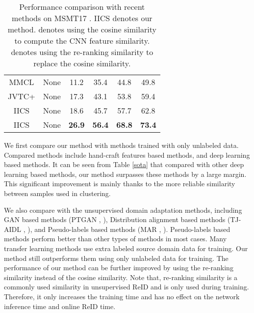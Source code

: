 \documentclass[final]{cvpr}
\begin{document}
\begin{table}
\begin{center}
{\begin{tabular}{c|c|cccc}
			MMCL \cite{multi-label}          & None                    & 11.2                       & 35.4   & 44.8   & 49.8    \\
			JVTC+ \cite{JVTC}                & None                    & 17.3                       & 43.1   & 53.8   & 59.4    \\ \hline
			IICS                & None                    & 18.6                       & 45.7   & 57.7   & 62.8    \\
			IICS               & None                    & \textbf{26.9}              & \textbf{56.4}   & \textbf{68.8}   & \textbf{73.4}    \\ \hline
		\end{tabular}}
	\end{center}
	\vspace{-2mm}
	\caption{Performance comparison with recent methods on MSMT17 \cite{PTGan}. IICS denotes our method. \dag denotes using the cosine similarity to compute the CNN feature similarity. \ddag denotes using the re-ranking similarity \cite{reranking} to replace the cosine similarity.}
	\label{msmt}
\end{table}




We first compare our method with methods trained with only unlabeled data. Compared methods include hand-craft features based methods, and deep learning based methods. It can be seen from Table \ref{sota} that compared with other deep learning based methods, our method surpasses these methods by a large margin. This significant improvement is mainly thanks to the more reliable similarity between samples used in clustering.

We also compare with the unsupervised domain adaptation methods, including GAN based methods (PTGAN \cite{PTGan}, \etc), Distribution alignment based methods (TJ-AIDL \cite{wang2018transferable}, \etc), and Pseudo-labels based methods (MAR \cite{yu2019unsupervised}, \etc).
Pseudo-labels based methods perform better than other types of methods in most cases.
Many transfer learning methods use extra labeled source domain data for training. Our method still outperforms them using only unlabeled data for training.  
The performance of our method can be further improved by using the re-ranking similarity \cite{reranking} instead of the cosine similarity. Note that, re-ranking similarity is a commonly used similarity in unsupervised ReID \cite{fu2019self, JVTC} and is only used during training. Therefore, it only increases the training time and has no effect on the network inference time and online ReID time.
\end{document}
